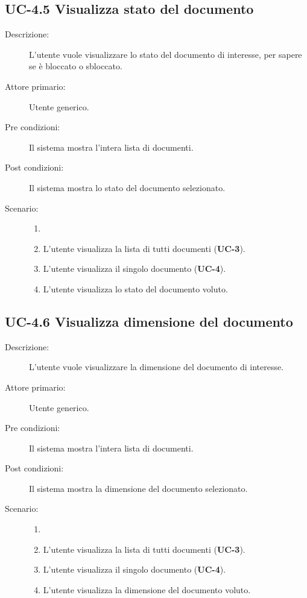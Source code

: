 \subsection{UC-4.5 Visualizza stato del documento}
\begin{description}
    \item[Descrizione:] L'utente vuole visualizzare lo stato del documento di interesse, per sapere se è bloccato o sbloccato.
    \item[Attore primario:] Utente generico.
    \item[Pre condizioni:] Il sistema mostra l’intera lista di documenti.
    \item[Post condizioni:] Il sistema mostra lo stato del documento selezionato.
    \item[Scenario:]
    \begin{enumerate}
        \item[]
        \item L’utente visualizza la lista di tutti documenti (\textbf{UC-3}).
        \item L'utente visualizza il singolo documento (\textbf{UC-4}).
        \item L'utente visualizza lo stato del documento voluto.
    \end{enumerate}
\end{description}

\subsection{UC-4.6 Visualizza dimensione del documento}
\begin{description}
    \item[Descrizione:] L'utente vuole visualizzare la dimensione del documento di interesse.
    \item[Attore primario:] Utente generico.
    \item[Pre condizioni:] Il sistema mostra l’intera lista di documenti.
    \item[Post condizioni:] Il sistema mostra la dimensione del documento selezionato.
    \item[Scenario:]
    \begin{enumerate}
        \item[]
        \item L’utente visualizza la lista di tutti documenti (\textbf{UC-3}).
        \item L'utente visualizza il singolo documento (\textbf{UC-4}).
        \item L'utente visualizza la dimensione del documento voluto.
    \end{enumerate}
\end{description}

